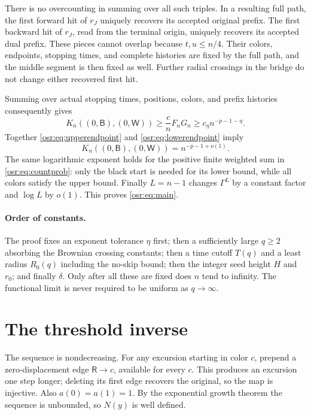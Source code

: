 \documentclass[11pt,letterpaper]{article}
\newcommand{\G}{\Gamma}\newcommand{\s}{\sqrt{17}}
\newcommand{\B}{\mathsf B}\newcommand{\RR}{\mathsf R}\newcommand{\GG}{\mathsf G}\newcommand{\W}{\mathsf W}
\numberwithin{equation}{section}
\begin{document}
There is no overcounting in summing over all such triples. In a resulting full path, the first forward hit of $r_J$ uniquely recovers its accepted original prefix. The first backward hit of $r_J$, read from the terminal origin, uniquely recovers its accepted dual prefix. These pieces cannot overlap because $t,u\le n/4$. Their colors, endpoints, stopping times, and complete histories are fixed by the full path, and the middle segment is then fixed as well. Further radial crossings in the bridge do not change either recovered first hit.

Summing over actual stopping times, positions, colors, and prefix histories consequently gives
\begin{equation}\label{osr:eq:lowerendpoint}
 K_n((0,\B),(0,\W))\ge\frac cnF_nG_n
                  \ge c_\eta n^{-p-1-\eta}.
\end{equation}
Together \eqref{osr:eq:upperendpoint} and \eqref{osr:eq:lowerendpoint} imply
\[
 K_n((0,\B),(0,\W))=n^{-p-1+o(1)}.
\]
The same logarithmic exponent holds for the positive finite weighted sum in \eqref{osr:eq:countprob}: only the black start is needed for its lower bound, while all colors satisfy the upper bound. Finally $L=n-1$ changes $\G^L$ by a constant factor and $\log L$ by $o(1)$. This proves \eqref{osr:eq:main}.

\paragraph{Order of constants.}
The proof fixes an exponent tolerance $\eta$ first; then a sufficiently large $q\ge2$ absorbing the Brownian crossing constants; then a time cutoff $T(q)$ and a least radius $R_0(q)$ including the no-skip bound; then the integer seed height $H$ and $r_0$; and finally $\delta$. Only after all these are fixed does $n$ tend to infinity. The functional limit is never required to be uniform as $q\to\infty$.

\section{The threshold inverse}\label{osr:sec:inverse}
The sequence is nondecreasing. For any excursion starting in color $c$, prepend a zero-displacement edge $\RR\to c$, available for every $c$. This produces an excursion one step longer; deleting its first edge recovers the original, so the map is injective. Also $a(0)=a(1)=1$. By the exponential growth theorem the sequence is unbounded, so $N(y)$ is well defined.
\end{document}
